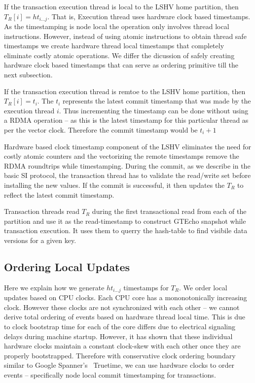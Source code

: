 If the transaction execution thread is local to the LSHV home partition, then $T_R[i] = ht_{i...j}$. 
That is, Execution thread uses hardware clock based timestamps. As the timestamping is node local the
operation only involves thread local instructions. However, instead of using atomic instructions to 
obtain thread safe timestamps we create hardware thread local timestamps that completely eliminate 
costly atomic operations. We differ the dicussion of safely creating hardware clock based timestamps
that can serve as ordering primitive till the next subsection.

If the transaction execution thread is remtoe to the LSHV home partition, then $T_R[i] = t_i $. The $t_i$
represents the latest commit timestamp that was made by the execution thread $i$. Thus incrementing the 
timestamp can be done without using a RDMA operation -- as this is the latest timestamp for this particular 
thread as per the vector clock. Therefore the commit timestamp would be $t_i + 1$

Hardware based clock timestamp component of the LSHV eliminates the need for costly atomic counters and
the vectorizing the remote timestamps remove the RDMA roundtrips while timestamping. During the commit,
as we describe in the basic SI protocol, the transaction thread has to validate the read/write set before
installing the new values. If the commit is successful, it then updates the 
$T_R$ to reflect the latest commit timestamp.

Transaction threads read $T_R$ during the first transactional read from each of the partition and use it
as the read-timestamp to construct GTEcho snapshot while transaction execution. It uses them to querry
the hash-table to find visibile data versions for a given key.

\subsection{Ordering Local Updates}
Here we explain how we generate $ht_{i...j}$ timestamps for $T_R$.
We order local updates based on CPU clocks. Each CPU core has a mononotonically increasing clock. However
these clocks are not synchronized with each other -- we cannot derive total ordering of events based on hardware thread
local time. This is due to clock bootstrap time for each of the core differs due to electrical signaling delays during machine
startup. However, it has shown that these individual hardware clocks maintain a constant clock-skew with each other once they are properly bootstrapped. Therefore with conservative clock ordering boundary similar to Google Spanner's~\cite{spanner}
Truetime, we can use hardware clocks to order events -- specifically node local commit timestamping for transactions.

